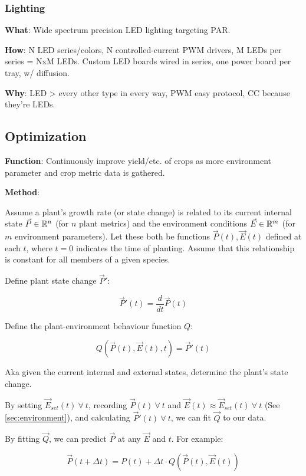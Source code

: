 \documentclass{report}
\begin{document}
\subsubsection{Lighting}
\label{sec:lighting}

\textbf{What}: Wide spectrum precision LED lighting targeting PAR.

\textbf{How}: N LED series/colors, N controlled-current PWM drivers, M LEDs per series = NxM LEDs. Custom LED boards wired in series, one power board per tray, w/ diffusion.

\textbf{Why}: LED > every other type in every way, PWM easy protocol, CC because they’re LEDs.


\subsection{Optimization}
\label{sec:optimization}

\textbf{Function}: Continuously improve yield/etc. of crops as more environment parameter and crop metric data is gathered.

\textbf{Method}: 

Assume a plant's growth rate (or state change) is related to its current internal state $\vec P \in \mathbb R^n$ (for $n$ plant metrics) and the environment conditions $\vec E \in \mathbb R^m$ (for $m$ environment parameters). Let these both be functions $\vec P (t),\vec E(t)$ defined at each $t$, where $t=0$ indicates the time of planting. Assume that this relationship is constant for all members of a given species.

Define plant state change $\vec P'$: 

$$\vec P'(t) = \frac{d}{dt}\vec P(t)$$

Define the plant-environment behaviour function $Q$: 

$$Q(\vec P(t), \vec E(t), t)=\vec P'(t)$$ 

Aka given the current internal and external states, determine the plant's state change.

By setting $\vec E_{set}(t)~\forall~ t$, recording $\vec P(t)~\forall~ t$ and $\vec E(t)\approx \vec E_{set}(t)~\forall~ t$ (See \ref{sec:environment}), and calculating $\vec P'(t)~\forall~ t$, we can fit $\vec Q$ to our data.

By fitting $\vec Q$, we can predict $\vec P$ at any $\vec E$ and $t$. For example:

$$\vec P(t+\Delta t)=P(t)+\Delta t\cdot Q(\vec P(t),\vec E(t))$$
\end{document}
